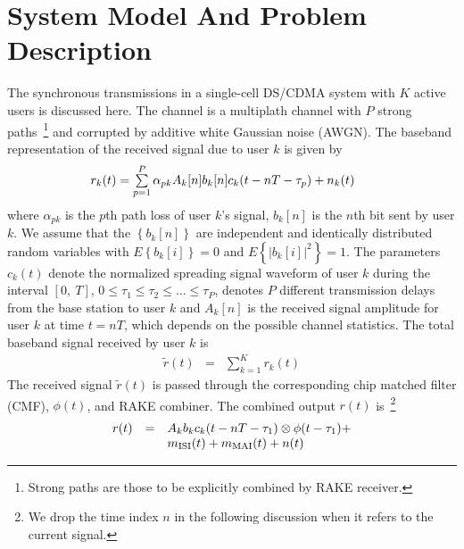 \documentclass[conference]{IEEEtran}
\begin{document}
\section{System Model And Problem Description}
The synchronous transmissions in a single-cell DS/CDMA system with
$K$ active users is discussed here. The channel is a multiplath
channel with $P$ strong paths~\footnote{Strong paths are those to
be explicitly combined by RAKE receiver.} and corrupted by
additive white Gaussian noise (AWGN). The baseband representation
of the received signal due to user $k$ is given by
\begin{equation}
\begin{array}{l}\hspace{-0.2in}
r_k(t)=\sum\limits_{p=1}^{P}\alpha_{pk}A_k[n]
b_k[n]c_k(t-nT-\tau_p)+n_k(t)
\end{array}
\end{equation}
\noindent where $\alpha_{pk}$ is the $p$th path loss of user $k$'s
signal, $b_k{[n]}$ is the $n$th bit sent by user $k$. We assume
that the $\left\{b_k{[n]}\right\}$ are independent and identically
distributed random variables with $E\left\{b_k{[i]}\right\}=0$ and
$E\left\{|b_k{[i]}|^2\right\}=1$. The parameters $c_k(t)$ denote
the normalized spreading signal waveform of user $k$ during the
interval $[0,\ T]$, $0\leq\tau_1\leq\tau_2\leq\ldots\leq\tau_P$,
denotes $P$ different transmission delays from the base station to
user $k$ and $A_k[n]$ is the received signal amplitude for user
$k$ at time $t=nT$, which depends on the possible channel
statistics. The total baseband signal received by user $k$ is
\begin{equation}
\begin{array}{rcl}
\tilde{r}(t)&=&\sum\limits_{k=1}^{K}r_k(t)
\end{array}
\end{equation}
The received signal $\tilde{r}(t)$ is passed through the
corresponding chip matched filter (CMF), $\phi(t)$, and RAKE
combiner. The combined output $r(t)$ is~\footnote{We drop the time
index $n$ in the following discussion when it refers to the
current signal.}
\begin{equation}\hspace{-0.0in}
\begin{array}{rcl}
r(t)&=&A_k b_k c_k(t-nT-\tau_1)\otimes \phi(t-\tau_1)+ \\
&&\hspace{0.0in} m_{\rm ISI}(t) + m_{\rm MAI}(t) + n(t)
\end{array}\label{r_t}
\end{equation}
\end{document}
